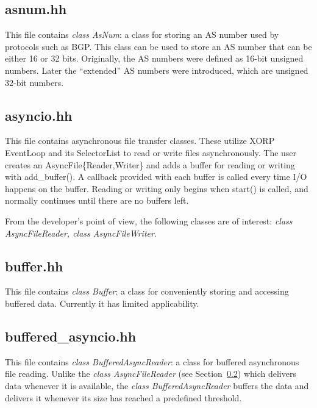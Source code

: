 \documentclass[11pt]{article}
\begin{document}
\subsection{asnum.hh}

This file contains \emph{class AsNum}: a class for storing an AS number
used by protocols such as BGP.
This class can be used to store an AS number that can be either
16 or 32 bits.  Originally, the AS numbers were defined as 16-bit
unsigned numbers.  Later the ``extended'' AS numbers were introduced,
which are unsigned 32-bit numbers.

\subsection{asyncio.hh}
\label{asyncio.hh}

This file contains
asynchronous file transfer classes.  These utilize XORP EventLoop
and its SelectorList to read or write files asynchronously.  The
user creates an AsyncFile\{Reader,Writer\} and adds a buffer for
reading or writing with add\_buffer().  A callback provided with
each buffer is called every time I/O happens on the buffer.
Reading or writing only begins when start() is called, and normally
continues until there are no buffers left.

From the developer's point of view, the following classes are of
interest: \emph{class AsyncFileReader, class AsyncFileWriter}.

\subsection{buffer.hh}

This file contains \emph{class Buffer}: a class for conveniently storing
and accessing buffered data.
Currently it has limited applicability.

\subsection{buffered\_asyncio.hh}

This file contains \emph{class BufferedAsyncReader}: a class for
buffered asynchronous file reading. Unlike the \emph{class AsyncFileReader}
(see Section~\ref{asyncio.hh}) which delivers data whenever it is available,
the \emph{class BufferedAsyncReader} buffers the data and delivers it
whenever its size has reached a predefined threshold.
\end{document}
